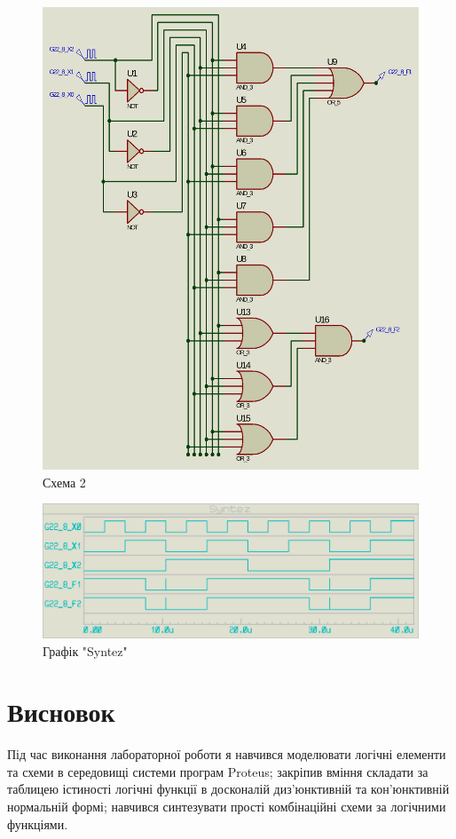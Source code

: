 \documentclass{article}
\begin{document}
\begin{normalsize}
	\begin{figure}[H]
		\centering
		\includegraphics[scale=0.29]{s2}	
		\caption{Схема 2}
	\end{figure}
	\begin{figure}[H]
		\centering
		\includegraphics[scale=0.35]{g4}	
		\caption{Графік "Syntez"}
	\end{figure}	

	\section*{Висновок}
	Під час виконання лабораторної роботи я навчився моделювати логічні елементи та схеми в середовищі системи програм Proteus; закріпив вміння складати за таблицею істиності логічні функції в досконалій диз'юнктивній та кон'юнктивній нормальній формі; навчився синтезувати прості комбінаційні схеми за логічними функціями.
	    
\end{normalsize}
\end{document}
